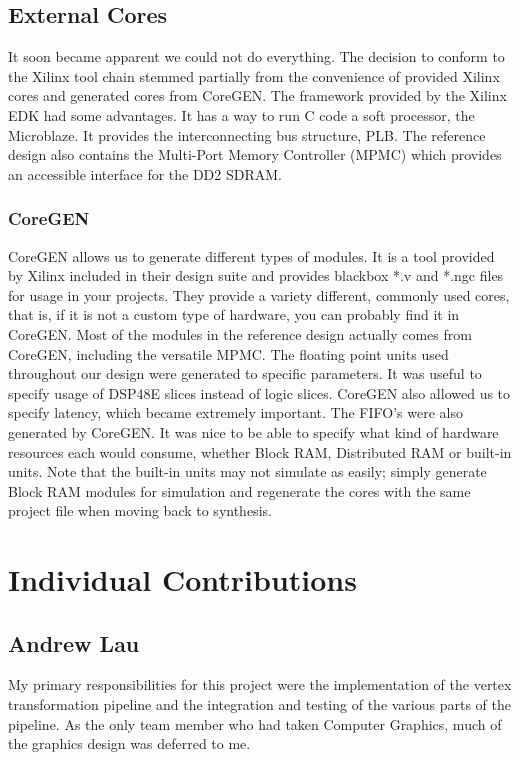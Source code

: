 \documentclass[letterpaper,10pt]{article}
\begin{document}
\subsection{External Cores}
It soon became apparent we could not do everything. The decision to conform to the Xilinx tool chain stemmed partially from the convenience of provided Xilinx cores and generated cores from CoreGEN.  The framework provided by the Xilinx EDK had some advantages.  It has a way to run C code a soft processor, the Microblaze.  It provides the interconnecting bus structure, PLB.  The reference design also contains the Multi-Port Memory Controller (MPMC) which provides an accessible interface for the DD2 SDRAM.  

\subsubsection{CoreGEN}
CoreGEN allows us to generate different types of modules.  It is a tool provided by Xilinx included in their design suite and provides blackbox *.v and *.ngc files for usage in your projects.  They provide a variety different, commonly used cores, that is, if it is not a custom type of hardware, you can probably find it in CoreGEN.  Most of the modules in the reference design actually comes from CoreGEN, including the versatile MPMC.  The floating point units used throughout our design were generated to specific parameters.  It was useful to specify usage of DSP48E slices instead of logic slices.  CoreGEN also allowed us to specify latency, which became extremely important.  The FIFO's were also generated by CoreGEN.  It was nice to be able to specify what kind of hardware resources each would consume, whether Block RAM, Distributed RAM or built-in units.  Note that the built-in units may not simulate as easily; simply generate Block RAM modules for simulation and regenerate the cores with the same project file when moving back to synthesis.


\section{Individual Contributions}
\subsection{Andrew Lau}
My primary responsibilities for this project were the implementation of the vertex transformation pipeline and the integration and testing of the various parts of the pipeline. As the only team member who had taken Computer Graphics, much of the graphics design was deferred to me. 
\end{document}
